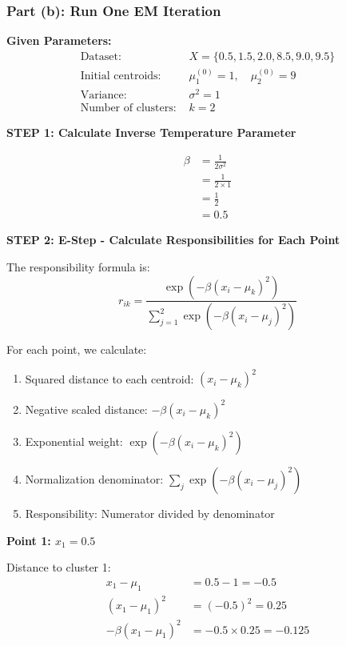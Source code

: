 \documentclass[12pt]{article}
\begin{document}
\subsubsection{Part (b): Run One EM Iteration}

\begin{solution}

\textbf{Given Parameters:}
\begin{align*}
\text{Dataset: } &X = \{0.5, 1.5, 2.0, 8.5, 9.0, 9.5\} \\
\text{Initial centroids: } &\mu_1^{(0)} = 1, \quad \mu_2^{(0)} = 9 \\
\text{Variance: } &\sigma^2 = 1 \\
\text{Number of clusters: } &k = 2
\end{align*}

\textbf{STEP 1: Calculate Inverse Temperature Parameter}

\begin{align*}
\beta &= \frac{1}{2\sigma^2} \\
&= \frac{1}{2 \times 1} \\
&= \frac{1}{2} \\
&= 0.5
\end{align*}

\textbf{STEP 2: E-Step - Calculate Responsibilities for Each Point}

The responsibility formula is:
\[
r_{ik} = \frac{\exp(-\beta(x_i - \mu_k)^2)}{\sum_{j=1}^2 \exp(-\beta(x_i - \mu_j)^2)}
\]

For each point, we calculate:
\begin{enumerate}
    \item Squared distance to each centroid: $(x_i - \mu_k)^2$
    \item Negative scaled distance: $-\beta(x_i - \mu_k)^2$
    \item Exponential weight: $\exp(-\beta(x_i - \mu_k)^2)$
    \item Normalization denominator: $\sum_j \exp(-\beta(x_i - \mu_j)^2)$
    \item Responsibility: Numerator divided by denominator
\end{enumerate}

\textbf{Point 1: $x_1 = 0.5$}

Distance to cluster 1:
\begin{align*}
x_1 - \mu_1 &= 0.5 - 1 = -0.5 \\
(x_1 - \mu_1)^2 &= (-0.5)^2 = 0.25 \\
-\beta(x_1 - \mu_1)^2 &= -0.5 \times 0.25 = -0.125
\end{align*}


\end{solution}
\end{document}
